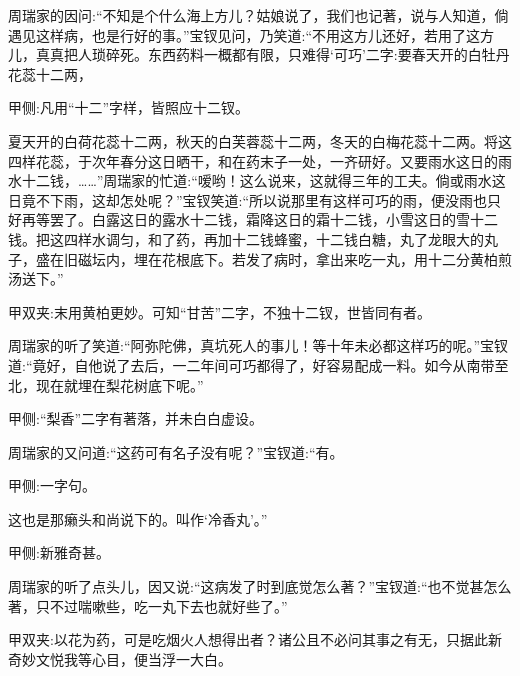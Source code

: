 \begin{parag}
    周瑞家的因问:“不知是个什么海上方儿？姑娘说了，我们也记著，说与人知道，倘遇见这样病，也是行好的事。”宝钗见问，乃笑道:“不用这方儿还好，若用了这方儿，真真把人琐碎死。东西药料一概都有限，只难得‘可巧’二字:要春天开的白牡丹花蕊十二两，\begin{note}甲侧:凡用“十二”字样，皆照应十二钗。\end{note}夏天开的白荷花蕊十二两，秋天的白芙蓉蕊十二两，冬天的白梅花蕊十二两。将这四样花蕊，于次年春分这日晒干，和在药末子一处，一齐研好。又要雨水这日的雨水十二钱，……”周瑞家的忙道:“嗳哟！这么说来，这就得三年的工夫。倘或雨水这日竟不下雨，这却怎处呢？”宝钗笑道:“所以说那里有这样可巧的雨，便没雨也只好再等罢了。白露这日的露水十二钱，霜降这日的霜十二钱，小雪这日的雪十二钱。把这四样水调匀，和了药，再加十二钱蜂蜜，十二钱白糖，丸了龙眼大的丸子，盛在旧磁坛内，埋在花根底下。若发了病时，拿出来吃一丸，用十二分黄柏煎汤送下。”\begin{note}甲双夹:末用黄柏更妙。可知“甘苦”二字，不独十二钗，世皆同有者。\end{note}
\end{parag}


\begin{parag}
    周瑞家的听了笑道:“阿弥陀佛，真坑死人的事儿！等十年未必都这样巧的呢。”宝钗道:“竟好，自他说了去后，一二年间可巧都得了，好容易配成一料。如今从南带至北，现在就埋在梨花树底下呢。”\begin{note}甲侧:“梨香”二字有著落，并未白白虚设。\end{note}周瑞家的又问道:“这药可有名子没有呢？”宝钗道:“有。\begin{note}甲侧:一字句。\end{note}这也是那癞头和尚说下的。叫作‘冷香丸’。”\begin{note}甲侧:新雅奇甚。\end{note}周瑞家的听了点头儿，因又说:“这病发了时到底觉怎么著？”宝钗道:“也不觉甚怎么著，只不过喘嗽些，吃一丸下去也就好些了。”\begin{note}甲双夹:以花为药，可是吃烟火人想得出者？诸公且不必问其事之有无，只据此新奇妙文悦我等心目，便当浮一大白。\end{note}
\end{parag}


